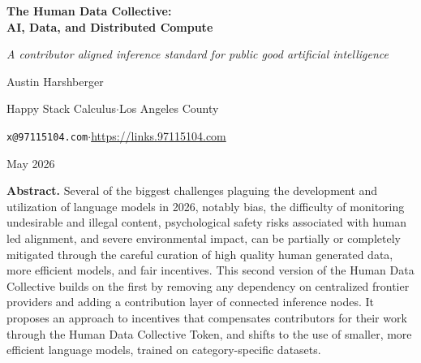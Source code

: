 \documentclass[10pt,a4paper,twocolumn]{article}
\begin{document}
\onecolumn
\thispagestyle{plain}
\begin{center}
{\LARGE\bfseries The Human Data Collective:\\[3pt]AI, Data, and Distributed Compute\par}
\vspace{6pt}
{\normalsize\itshape A contributor aligned inference standard for public good artificial intelligence\par}
\vspace{10pt}
{\large Austin Harshberger\par}
\vspace{2pt}
{\small Happy Stack Calculus\quad$\cdot$\quad Los Angeles County\par}
{\small \texttt{x@97115104.com}\quad$\cdot$\quad \url{https://links.97115104.com}\par}
\vspace{4pt}
{\small May 2026\par}
\end{center}

\vspace{10pt}
\begin{center}
\begin{minipage}{0.92\textwidth}
\small\textbf{Abstract.}\quad
Several of the biggest challenges plaguing the development and utilization of language models in 2026, notably bias, the difficulty of monitoring undesirable and illegal content, psychological safety risks associated with human led alignment, and severe environmental impact, can be partially or completely mitigated through the careful curation of high quality human generated data, more efficient models, and fair incentives. This second version of the Human Data Collective builds on the first \citep{harshberger2026hdcv1} by removing any dependency on centralized frontier providers and adding a contribution layer of connected inference nodes. It proposes an approach to incentives that compensates contributors for their work through the Human Data Collective Token, and shifts to the use of smaller, more efficient language models, trained on category-specific datasets.
\end{minipage}
\end{center}
\end{document}
